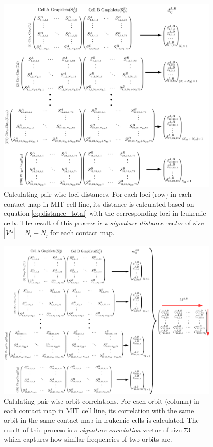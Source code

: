 \documentclass[a4,center,fleqn]{NAR}
\begin{document}
\begin{figure}
    \centering
    \includegraphics[width=.5\textwidth]{figures/graphlet_distance_schema.png}
    \caption{Calculating pair-wise loci distances. For each loci (row) 
    in each
    contact map in MIT cell line, its distance is calculated based on
    equation \ref{eq:distance_total} with the corresponding loci in
    leukemic cells. The result of this process is a 
    \textit{signature distance vector} of size
    $|V^{ij}| = N_i+N_j$ for each contact map.
    }
    \label{graphlet_distance_schema}
\end{figure}
\begin{figure}
    \centering
    \includegraphics[width=.5\textwidth]{figures/graphlet_correlation_schema.png}
    \caption{Calulating pair-wise orbit correlations. For each orbit (column)
    in each contact map in MIT cell line, its correlation with the
    same orbit in the same contact map 
    in leukemic cells is calculated. The result of
    this process is a \textit{signature correlation} vector of size
    73 which captures how similar frequencies of two orbits are.}
    \label{graphlet_correlation_schema}
\end{figure}
\end{document}
